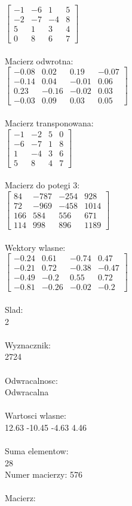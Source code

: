 \documentclass[a4paper,12pt]{article}
\begin{document}
$\begin{bmatrix} -1&-6&1&5\\-2&-7&-4&8\\5&1&3&4\\0&8&6&7 \end{bmatrix}$
\\
\\
Macierz odwrotna:\\

$\begin{bmatrix} -0.08&0.02&0.19&-0.07\\-0.14&0.04&-0.01&0.06\\0.23&-0.16&-0.02&0.03\\-0.03&0.09&0.03&0.05 \end{bmatrix}$
\\
\\
Macierz transponowana:\\

$\begin{bmatrix} -1&-2&5&0\\-6&-7&1&8\\1&-4&3&6\\5&8&4&7 \end{bmatrix}$
\\
\\
Macierz do potegi 3:\\

$\begin{bmatrix} 84&-787&-254&928\\72&-969&-458&1014\\166&584&556&671\\114&998&896&1189 \end{bmatrix}$
\\
\\
Wektory wlasne:\\

$\begin{bmatrix} -0.24&0.61&-0.74&0.47\\-0.21&0.72&-0.38&-0.47\\-0.49&-0.2&0.55&0.72\\-0.81&-0.26&-0.02&-0.2 \end{bmatrix}$
\\
\\
Slad:\\
2
\\
\\
Wyznacznik:\\
2724
\\
\\
Odwracalnosc:\\
Odwracalna
\\
\\
Wartosci wlasne:\\
12.63 -10.45 -4.63 4.46
\\
\\
Suma elementow:\\
28
\\
\newpage
Numer macierzy:
576
\\
\\
Macierz:\\
\end{document}
